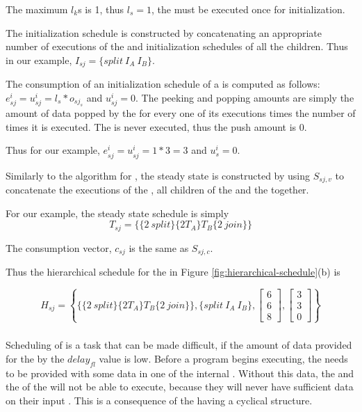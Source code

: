 The maximum $l_k$s is 1, thus $l_s = 1$, the {\splitter} must be
executed once for initialization.

The initialization schedule is constructed by concatenating an
appropriate number of executions of the {\splitter} and
initialization schedules of all the children.  Thus in our
example, $I_{sj} = \{split\ I_A\ I_B\}$.

The consumption of an initialization schedule of a  {\splitjoin} is
computed as follows:  $e^i_{sj} = u^i_{sj} = l_s * o_{sj_s}$ and
$u^i_{sj} = 0$. The peeking and popping amounts are simply the
amount of data popped by the {\splitter} for every one of its
executions times the number of times it is executed.  The {\joiner}
is never executed, thus the push amount is 0.

Thus for our example, $e^i_{sj} = u^i_{sj} = 1 * 3 = 3$ and
$u^i_{s} = 0$.


Similarly to the algorithm for {\pipeline}, the steady state is
constructed by using $S_{sj,v}$ to concatenate the executions of
the {\splitter}, all children of the {\splitjoin} and the {\joiner}
together.

For our example, the steady state schedule is simply $$T_{sj} =
\{\{2\ split\}\{2T_A\}T_B\{2\ join\}\}$$

The consumption vector, $c_{sj}$ is the same as $S_{sj,c}$.

Thus the hierarchical schedule for the {\splitjoin} in Figure
\ref{fig:hierarchical-schedule}(b) is

\begin{displaymath}
H_{sj} = \left\{\{\{2\ split\}\{2T_A\}T_B\{2\ join\}\},\{split\
I_A\ I_B\}, \left[
\begin{array}{c}
6\\6\\8
\end{array}\right], \left[
\begin{array}{c}
3\\3\\0
\end{array}\right] \right\}
\end{displaymath}

\subsubsection{\feedbackloops}
\label{sec:sas-fl}

Scheduling of {\feedbackloops} is a task that can be made difficult,
if the amount of data provided for the {\feedbackloop} by the
$delay_{fl}$ value is low. Before a {\StreamIt} program begins
executing, the {\feedbackloop} needs to be provided with some data
in one of the internal {{\Channels}}. Without this data, the {\splitter}
and the {\joiner} of the {\feedbackloop} will not be able to execute,
because they will never have sufficient data on their input
{{\Channels}}. This is a consequence of the {\feedbackloop} having a
cyclical structure.

